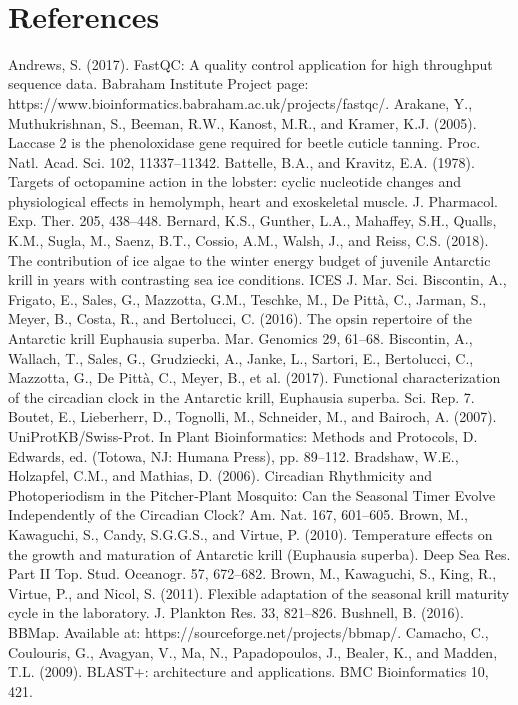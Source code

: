 
\section{References}
Andrews, S. (2017). FastQC: A quality control application for high throughput sequence data. Babraham Institute Project page: https://www.bioinformatics.babraham.ac.uk/projects/fastqc/.
Arakane, Y., Muthukrishnan, S., Beeman, R.W., Kanost, M.R., and Kramer, K.J. (2005). Laccase 2 is the phenoloxidase gene required for beetle cuticle tanning. Proc. Natl. Acad. Sci. 102, 11337–11342.
Battelle, B.A., and Kravitz, E.A. (1978). Targets of octopamine action in the lobster: cyclic nucleotide changes and physiological effects in hemolymph, heart and exoskeletal muscle. J. Pharmacol. Exp. Ther. 205, 438–448.
Bernard, K.S., Gunther, L.A., Mahaffey, S.H., Qualls, K.M., Sugla, M., Saenz, B.T., Cossio, A.M., Walsh, J., and Reiss, C.S. (2018). The contribution of ice algae to the winter energy budget of juvenile Antarctic krill in years with contrasting sea ice conditions. ICES J. Mar. Sci.
Biscontin, A., Frigato, E., Sales, G., Mazzotta, G.M., Teschke, M., De Pittà, C., Jarman, S., Meyer, B., Costa, R., and Bertolucci, C. (2016). The opsin repertoire of the Antarctic krill Euphausia superba. Mar. Genomics 29, 61–68.
Biscontin, A., Wallach, T., Sales, G., Grudziecki, A., Janke, L., Sartori, E., Bertolucci, C., Mazzotta, G., De Pittà, C., Meyer, B., et al. (2017). Functional characterization of the circadian clock in the Antarctic krill, Euphausia superba. Sci. Rep. 7.
Boutet, E., Lieberherr, D., Tognolli, M., Schneider, M., and Bairoch, A. (2007). UniProtKB/Swiss-Prot. In Plant Bioinformatics: Methods and Protocols, D. Edwards, ed. (Totowa, NJ: Humana Press), pp. 89–112.
Bradshaw, W.E., Holzapfel, C.M., and Mathias, D. (2006). Circadian Rhythmicity and Photoperiodism in the Pitcher‐Plant Mosquito: Can the Seasonal Timer Evolve Independently of the Circadian Clock? Am. Nat. 167, 601–605.
Brown, M., Kawaguchi, S., Candy, S.G.G.S., and Virtue, P. (2010). Temperature effects on the growth and maturation of Antarctic krill (Euphausia superba). Deep Sea Res. Part II Top. Stud. Oceanogr. 57, 672–682.
Brown, M., Kawaguchi, S., King, R., Virtue, P., and Nicol, S. (2011). Flexible adaptation of the seasonal krill maturity cycle in the laboratory. J. Plankton Res. 33, 821–826.
Bushnell, B. (2016). BBMap. Available at: https://sourceforge.net/projects/bbmap/.
Camacho, C., Coulouris, G., Avagyan, V., Ma, N., Papadopoulos, J., Bealer, K., and Madden, T.L. (2009). BLAST+: architecture and applications. BMC Bioinformatics 10, 421.

